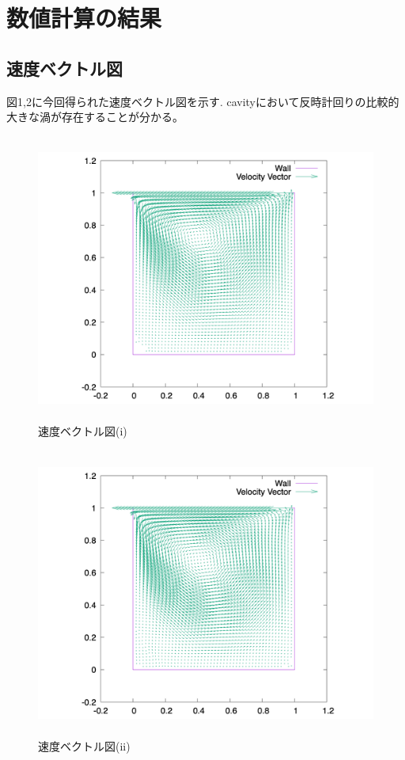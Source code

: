 \documentclass[upLaTeX,a4paper]{jsarticle}
\begin{document}
\section{数値計算の結果}
\subsection{速度ベクトル図}
図1,2に今回得られた速度ベクトル図を示す.
cavityにおいて反時計回りの比較的大きな渦が存在することが分かる。

\begin{figure}[H]
  \centering
  \includegraphics[height=9.5cm]{outputs/img/velocity_vector_re50.png}
  \caption{速度ベクトル図(i)}
  \label{fig:velocity_vector_re50}
\end{figure}
\begin{figure}[H]
  \centering
  \includegraphics[height=9.5cm]{outputs/img/velocity_vector_re200.png}
  \caption{速度ベクトル図(ii)}
  \label{fig:velocity_vector_re200}
\end{figure}
\end{document}
